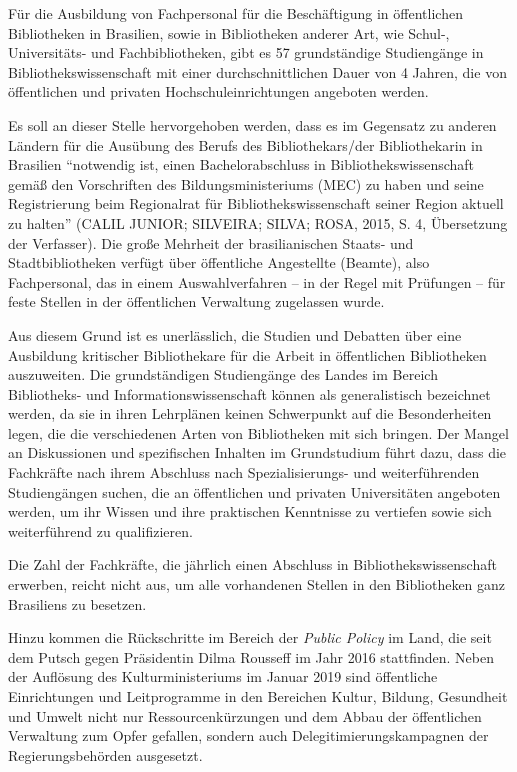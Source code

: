 \documentclass[a4paper,
fontsize=11pt,
oneside,
numbers=noperiodatend,
parskip=half-,
bibliography=totoc,
final
]{scrartcl}
\begin{document}
Für die Ausbildung von Fachpersonal für die Beschäftigung in
öffentlichen Bibliotheken in Brasilien, sowie in Bibliotheken anderer
Art, wie Schul-, Universitäts- und Fachbibliotheken, gibt es 57
grundständige Studiengänge in Bibliothekswissenschaft mit einer
durchschnittlichen Dauer von 4 Jahren, die von öffentlichen und privaten
Hochschuleinrichtungen angeboten werden.

Es soll an dieser Stelle hervorgehoben werden, dass es im Gegensatz zu
anderen Ländern für die Ausübung des Berufs des Bibliothekars/der
Bibliothekarin in Brasilien \enquote{notwendig ist, einen
Bachelorabschluss in Bibliothekswissenschaft gemäß den Vorschriften des
Bildungsministeriums (MEC) zu haben und seine Registrierung beim
Regionalrat für Bibliothekswissenschaft seiner Region aktuell zu halten}
(CALIL JUNIOR; SILVEIRA; SILVA; ROSA, 2015, S. 4, Übersetzung der
Verfasser). Die große Mehrheit der brasilianischen Staats- und
Stadtbibliotheken verfügt über öffentliche Angestellte (Beamte), also
Fachpersonal, das in einem Auswahlverfahren -- in der Regel mit
Prüfungen -- für feste Stellen in der öffentlichen Verwaltung zugelassen
wurde.

Aus diesem Grund ist es unerlässlich, die Studien und Debatten über eine
Ausbildung kritischer Bibliothekare für die Arbeit in öffentlichen
Bibliotheken auszuweiten. Die grundständigen Studiengänge des Landes im
Bereich Bibliotheks- und Informationswissenschaft können als
generalistisch bezeichnet werden, da sie in ihren Lehrplänen keinen
Schwerpunkt auf die Besonderheiten legen, die die verschiedenen Arten
von Bibliotheken mit sich bringen. Der Mangel an Diskussionen und
spezifischen Inhalten im Grundstudium führt dazu, dass die Fachkräfte
nach ihrem Abschluss nach Spezialisierungs- und weiterführenden
Studiengängen suchen, die an öffentlichen und privaten Universitäten
angeboten werden, um ihr Wissen und ihre praktischen Kenntnisse zu
vertiefen sowie sich weiterführend zu qualifizieren.

Die Zahl der Fachkräfte, die jährlich einen Abschluss in
Bibliothekswissenschaft erwerben, reicht nicht aus, um alle vorhandenen
Stellen in den Bibliotheken ganz Brasiliens zu besetzen.

Hinzu kommen die Rückschritte im Bereich der \emph{Public Policy} im
Land, die seit dem Putsch gegen Präsidentin Dilma Rousseff im Jahr 2016
stattfinden. Neben der Auflösung des Kulturministeriums im Januar 2019
sind öffentliche Einrichtungen und Leitprogramme in den Bereichen
Kultur, Bildung, Gesundheit und Umwelt nicht nur Ressourcenkürzungen und
dem Abbau der öffentlichen Verwaltung zum Opfer gefallen, sondern auch
Delegitimierungskampagnen der Regierungsbehörden ausgesetzt.
\end{document}
